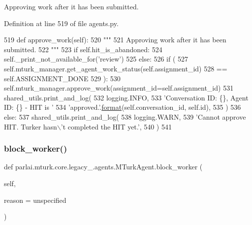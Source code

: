 \begin{DoxyVerb}Approving work after it has been submitted.
\end{DoxyVerb}
 

Definition at line 519 of file agents.\+py.


\begin{DoxyCode}
519     \textcolor{keyword}{def }approve\_work(self):
520         \textcolor{stringliteral}{"""}
521 \textcolor{stringliteral}{        Approving work after it has been submitted.}
522 \textcolor{stringliteral}{        """}
523         \textcolor{keywordflow}{if} self.hit\_is\_abandoned:
524             self.\_print\_not\_available\_for(\textcolor{stringliteral}{'review'})
525         \textcolor{keywordflow}{else}:
526             \textcolor{keywordflow}{if} (
527                 self.mturk\_manager.get\_agent\_work\_status(self.assignment\_id)
528                 == self.ASSIGNMENT\_DONE
529             ):
530                 self.mturk\_manager.approve\_work(assignment\_id=self.assignment\_id)
531                 shared\_utils.print\_and\_log(
532                     logging.INFO,
533                     \textcolor{stringliteral}{'Conversation ID: \{\}, Agent ID: \{\} - HIT is '}
534                     \textcolor{stringliteral}{'approved.'}.\hyperlink{namespaceparlai_1_1chat__service_1_1services_1_1messenger_1_1shared__utils_a32e2e2022b824fbaf80c747160b52a76}{format}(self.conversation\_id, self.id),
535                 )
536             \textcolor{keywordflow}{else}:
537                 shared\_utils.print\_and\_log(
538                     logging.WARN,
539                     \textcolor{stringliteral}{'Cannot approve HIT. Turker hasn\(\backslash\)'t completed the HIT yet.'},
540                 )
541 
\end{DoxyCode}
\mbox{\label{classparlai_1_1mturk_1_1core_1_1legacy__2018_1_1agents_1_1MTurkAgent_a50e51af01741ae9de7178971e9dc9f0e}} 
\subsubsection{\texorpdfstring{block\+\_\+worker()}{block\_worker()}}
{\footnotesize\ttfamily def parlai.\+mturk.\+core.\+legacy\+\_.\+agents.\+M\+Turk\+Agent.\+block\+\_\+worker (\begin{DoxyParamCaption}\item[{}]{self,  }\item[{}]{reason = {\ttfamily \textquotesingle{}unspecified\textquotesingle{}} }\end{DoxyParamCaption})}

